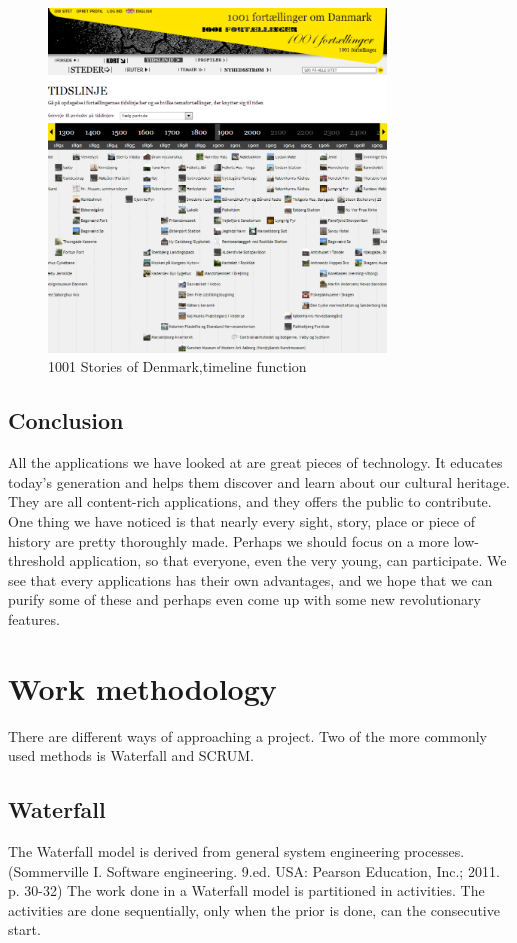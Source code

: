 \documentclass[11pt]{book}
\begin{document}
\begin{figure}[H]
      \centering
      \includegraphics[width=0.8\textwidth]{Figures/Prestudy/1001storiesWebsiteTimeline.png}
      \caption{1001 Stories of Denmark,timeline function}
      \label{fig:pre_1001StoriesDenmarkTimeLine}
\end{figure}

\subsection{Conclusion}
All the applications we have looked at are great pieces of technology. It educates today’s generation and helps them discover and learn about our cultural heritage. They are all content-rich applications, and they offers the public to contribute. One thing we have noticed is that nearly every sight, story, place or piece of history are pretty thoroughly made. Perhaps we should focus on a more low-threshold application, so that everyone, even the very young, can participate.
We see that every applications has their own advantages, and we hope that we can purify some of these and perhaps even come up with some new revolutionary features.


\section{Work methodology}
There are different ways of approaching a project. Two of the more commonly used methods is Waterfall and SCRUM.

\subsection{Waterfall}
The Waterfall model is derived from general system engineering processes. (Sommerville I. Software engineering. 9.ed. USA: Pearson Education, Inc.; 2011. p. 30-32) The work done in a Waterfall model is partitioned in activities. The activities are done sequentially, only when the prior is done, can the consecutive start.
\end{document}
